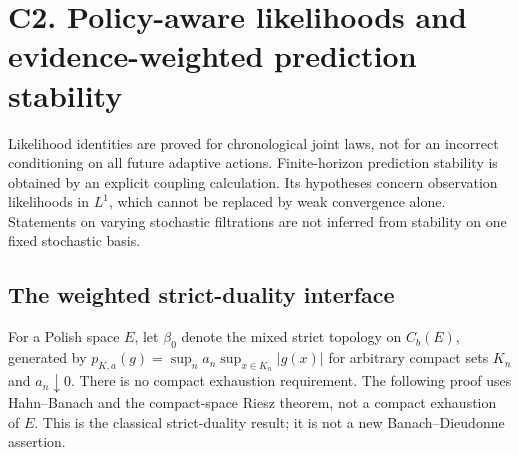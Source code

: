 \section{C2. Policy-aware likelihoods and evidence-weighted prediction stability}
\label{sec:r33-c2}

Likelihood identities are proved for chronological joint laws, not for an incorrect conditioning on all future adaptive actions. Finite-horizon prediction stability is obtained by an explicit coupling calculation. Its hypotheses concern observation likelihoods in $L^1$, which cannot be replaced by weak convergence alone. Statements on varying stochastic filtrations are not inferred from stability on one fixed stochastic basis.

\subsection{The weighted strict-duality interface}
For a Polish space $E$, let $\beta_0$ denote the mixed strict topology on $C_b(E)$, generated by $p_{K,a}(g)=\sup_n a_n\sup_{x\in K_n}|g(x)|$ for arbitrary compact sets $K_n$ and $a_n\downarrow0$. There is no compact exhaustion requirement. The following proof uses Hahn--Banach and the compact-space Riesz theorem, not a compact exhaustion of $E$. This is the classical strict-duality result; it is not a new Banach--Dieudonne assertion.

